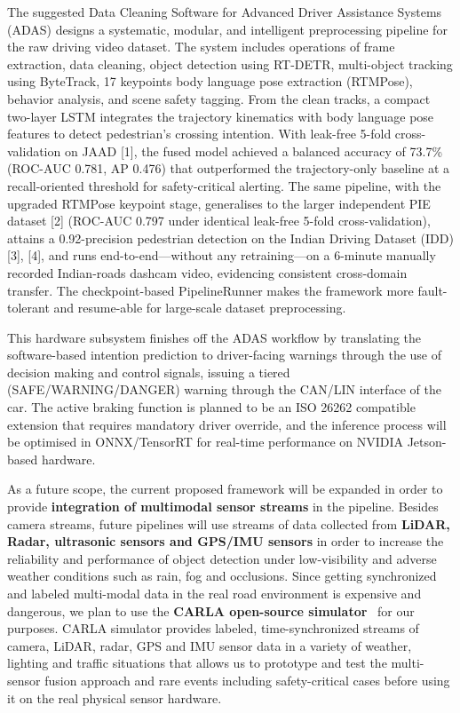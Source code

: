 \documentclass[conference]{IEEEtran}
\begin{document}
The suggested Data Cleaning Software for Advanced Driver Assistance Systems (ADAS) designs a systematic, modular, and intelligent preprocessing pipeline for the raw driving video dataset. The system includes operations of frame extraction, data cleaning, object detection using RT-DETR, multi-object tracking using ByteTrack, 17 keypoints body language pose extraction (RTMPose), behavior analysis, and scene safety tagging. From the clean tracks, a compact two-layer LSTM integrates the trajectory kinematics with body language pose features to detect pedestrian's crossing intention. With leak-free 5-fold cross-validation on JAAD [1], the fused model achieved a balanced accuracy of 73.7\% (ROC-AUC 0.781, AP 0.476) that outperformed the trajectory-only baseline at a recall-oriented threshold for safety-critical alerting. The same pipeline, with the upgraded RTMPose keypoint stage, generalises to the larger independent PIE dataset [2] (ROC-AUC 0.797 under identical leak-free 5-fold cross-validation), attains a 0.92-precision pedestrian detection on the Indian Driving Dataset (IDD) [3], [4], and runs end-to-end---without any retraining---on a 6-minute manually recorded Indian-roads dashcam video, evidencing consistent cross-domain transfer. The checkpoint-based PipelineRunner makes the framework more fault-tolerant and resume-able for large-scale dataset preprocessing.

This hardware subsystem finishes off the ADAS workflow by translating the software-based intention prediction to driver-facing warnings through the use of decision making and control signals, issuing a tiered (SAFE/WARNING/DANGER) warning through the CAN/LIN interface of the car. The active braking function is planned to be an ISO 26262 compatible extension that requires mandatory driver override, and the inference process will be optimised in ONNX/TensorRT for real-time performance on NVIDIA Jetson-based hardware.

As a future scope, the current proposed framework will be expanded in order to provide \textbf{integration of multimodal sensor streams} in the pipeline. Besides camera streams, future pipelines will use streams of data collected from \textbf{LiDAR, Radar, ultrasonic sensors and GPS/IMU sensors} in order to increase the reliability and performance of object detection under low-visibility and adverse weather conditions such as rain, fog and occlusions. Since getting synchronized and labeled multi-modal data in the real road environment is expensive and dangerous, we plan to use the \textbf{CARLA open-source simulator}~\cite{carla} for our purposes. CARLA simulator provides labeled, time-synchronized streams of camera, LiDAR, radar, GPS and IMU sensor data in a variety of weather, lighting and traffic situations that allows us to prototype and test the multi-sensor fusion approach and rare events including safety-critical cases before using it on the real physical sensor hardware.
\end{document}
